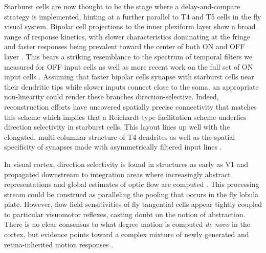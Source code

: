 Starburst cells are now thought to be the stage where a delay-and-compare strategy is implemented, hinting at a further parallel to T4 and T5 cells in the fly visual system. Bipolar cell projections to the inner plexiform layer show a broad range of response kinetics, with slower characteristics dominating at the fringe and faster responses being prevalent toward the center of both ON and OFF layer \citep{Baden:2013ir}. This bears a striking resemblance to the spectrum of temporal filters we measured for OFF input cells as well as more recent work on the full set of ON input cells \citep{Arenz:2017aa,Strother:2017aa}. Assuming that faster bipolar cells synapse with starburst cells near their dendritic tips while slower inputs connect close to the soma, an appropriate non-linearity could render these branches direction-selective. Indeed, reconstruction efforts have uncovered spatially precise connectivity that matches this scheme \citep{Kim:2014aa} which implies that a Reichardt-type facilitation scheme underlies direction selectivity in starburst cells. This layout lines up well with the elongated, multi-columnar structure of T4 dendrites as well as the spatial specificity of synapses made with asymmetrically filtered input lines \citep{Takemura:2017aa}.

In visual cortex, direction selectivity is found in structures as early as V1 and propagated downstream to integration areas where increasingly abstract representations and global estimates of optic flow are computed \citep[for a review of motion-critical primate area MT, see][]{Born:2005aa}. This processing stream could be construed as paralleling the pooling that occurs in the fly lobula plate. However, flow field sensitivities of fly tangential cells appear tightly coupled to particular visuomotor reflexes, casting doubt on the notion of abstraction. There is no clear consensus to what degree motion is computed \textit{de novo} in the cortex, but evidence points toward a complex mixture of newly generated and retina-inherited motion responses \citep{CruzMartin:2014aa}.



